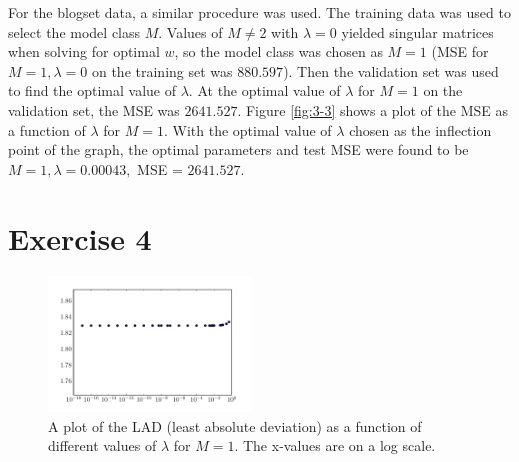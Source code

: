 \documentclass[10pt]{article}
\begin{document}
For the blogset data, a similar procedure was used. The training data was used to select the model class $M$. Values of $M \neq 2$ with $\lambda = 0$ yielded singular matrices when solving for optimal $w$, so the model class was chosen as $M = 1$ (MSE for $M = 1, \lambda = 0$ on the training set was $880.597$). Then the validation set was used to find the optimal value of $\lambda$. At the optimal value of $\lambda$ for $M = 1$ on the validation set, the MSE was $2641.527$. Figure \ref{fig:3-3} shows a plot of the MSE as a function of $\lambda$ for $M = 1$. With the optimal value of $\lambda$ chosen as the inflection point of the graph, the optimal parameters and test MSE were found to be $M = 1, \lambda = 0.00043,$ MSE = $2641.527$. 

\section{Exercise 4}

\begin{figure}[!ht]
	\begin{center}
	\includegraphics[width=0.48\textwidth]{exercise4-1.pdf}
	\caption{A plot of the LAD (least absolute deviation) as a function of different values of $\lambda$ for $M = 1$. The x-values are on a log scale.}
	\label{fig:4-1}
	\end{center}
\end{figure}
\end{document}
